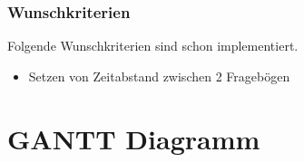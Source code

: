 \documentclass[a4paper]{scrreprt}
\begin{document}
                \subsection{Wunschkriterien}
                \par
                Folgende Wunschkriterien sind schon implementiert. 
                        \begin{itemize}
                            \item Setzen von Zeitabstand zwischen 2 Frageb\"ogen
                        \end{itemize}
                        \vspace*{0.5cm}


           \newpage
    \chapter{GANTT Diagramm}
\end{document}
